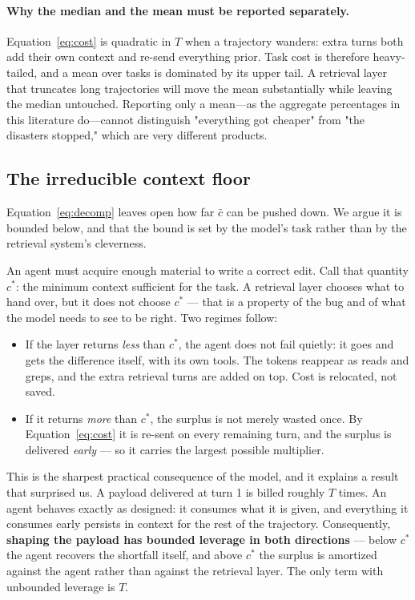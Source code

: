 \documentclass[11pt,letterpaper]{article}
\begin{document}
\paragraph{Why the median and the mean must be reported separately.}
Equation~\eqref{eq:cost} is quadratic in $T$ when a trajectory wanders: extra
turns both add their own context and re-send everything prior. Task cost is
therefore heavy-tailed, and a mean over tasks is dominated by its upper tail. A
retrieval layer that truncates long trajectories will move the mean substantially
while leaving the median untouched. Reporting only a mean---as the aggregate
percentages in this literature do---cannot distinguish "everything got cheaper"
from "the disasters stopped," which are very different products.

\subsection{The irreducible context floor}
\label{sec:floor}
Equation~\eqref{eq:decomp} leaves open how far $\bar{c}$ can be pushed down. We
argue it is bounded below, and that the bound is set by the model's task rather
than by the retrieval system's cleverness.

An agent must acquire enough material to write a correct edit. Call that quantity
$c^{*}$: the minimum context sufficient for the task. A retrieval layer chooses
what to hand over, but it does not choose $c^{*}$ --- that is a property of the
bug and of what the model needs to see to be right. Two regimes follow:

\begin{itemize}
\item If the layer returns \emph{less} than $c^{*}$, the agent does not fail
quietly: it goes and gets the difference itself, with its own tools. The tokens
reappear as reads and greps, and the extra retrieval turns are added on top. Cost
is relocated, not saved.
\item If it returns \emph{more} than $c^{*}$, the surplus is not merely wasted
once. By Equation~\eqref{eq:cost} it is re-sent on every remaining turn, and the
surplus is delivered \emph{early} --- so it carries the largest possible
multiplier.
\end{itemize}

This is the sharpest practical consequence of the model, and it explains a result
that surprised us. A payload delivered at turn 1 is billed roughly $T$ times. An
agent behaves exactly as designed: it consumes what it is given, and everything it
consumes early persists in context for the rest of the trajectory. Consequently,
\textbf{shaping the payload has bounded leverage in both directions} --- below
$c^{*}$ the agent recovers the shortfall itself, and above $c^{*}$ the surplus is
amortized against the agent rather than against the retrieval layer. The only term
with unbounded leverage is $T$.
\end{document}
